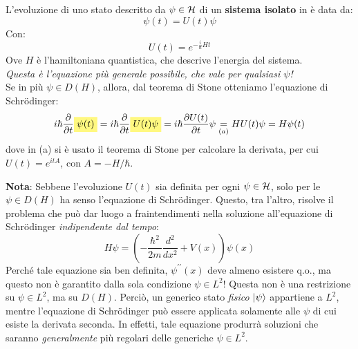 \documentclass[../../FisicaTeorica.tex]{subfiles}
\begin{document}
\begin{axi}
L'evoluzione di uno stato descritto da $\psi \in \mathcal{H}$ di un \textbf{sistema isolato} in \MQ è data da:
\[
\psi \left(t\right)=U\left(t\right)\psi 
\]
Con:
\[
U\left(t\right)=e^{-\frac{i}{\hbar}Ht}
\]
Ove $H$ è l'hamiltoniana quantistica, che descrive l'energia del sistema.\\
\textit{Questa è l'equazione più generale possibile, che vale per qualsiasi $\psi$!}\\

Se in più $\psi \in D(H)$, allora, dal teorema di Stone otteniamo l'equazione di Schrödinger:
\[
i\hbar \frac{\partial}{\partial t}\hlc{Yellow}{\psi(t)} =
i\hbar \frac{\partial}{\partial t} \hlc{Yellow}{U(t)\psi}=
 i\hbar \frac{\partial U(t)}{\partial t}\psi \underset{(a)}{=} HU(t)\psi = H\psi(t) 
\]
dove in (a) si è usato il teorema di Stone per calcolare la derivata, per cui $U(t)=e^{itA}$, con $A = -H/\hbar$.
\end{axi}


\textbf{Nota}: Sebbene l'evoluzione $U(t)$ sia definita per ogni $\psi \in \mathcal{H}$, solo per le $\psi \in D(H)$ ha senso l'equazione di Schrödinger. Questo, tra l'altro, risolve il problema che può dar luogo a fraintendimenti nella soluzione all'equazione di Schrödinger \textit{indipendente dal tempo}:
\[
        H\psi =\left(-\frac{\hbar^2}{2m}\frac{d^2}{dx^2}+V\left(x\right)\right)\psi \left(x\right)
\]
        Perché tale equazione sia ben definita, $\psi^{\prime\prime}(x)$ deve almeno esistere q.o., ma questo non è garantito dalla sola condizione $\psi \in L^2$! Questa non è una restrizione su $\psi \in L^2$, ma su $D(H)$. Perciò, un generico stato \textit{fisico} $\ket{\psi}$ appartiene a $L^2$, mentre l'equazione di Schr\"odinger può essere applicata solamente alle $\psi$ di cui esiste la derivata seconda. In effetti, tale equazione produrrà soluzioni che saranno \textit{generalmente} più regolari delle generiche $\psi \in L^2$.\\
\end{document}
